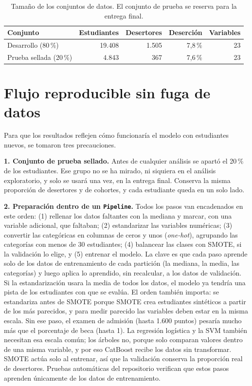 \documentclass[11pt,a4paper]{article}
\begin{document}
\begin{table}[H]
\centering
\small
\caption{Tamaño de los conjuntos de datos. El conjunto de prueba se reserva para la entrega final.}
\label{tab:escenarios}
\begin{tabular}{lrrrr}
\toprule
Conjunto & Estudiantes & Desertores & Deserción & Variables \\
\midrule
Desarrollo (80\,\%) & 19.408 & 1.505 & 7,8\,\% & 23 \\
Prueba sellada (20\,\%) & 4.843 & 367 & 7,6\,\% & 23 \\
\bottomrule
\end{tabular}
\end{table}

\section{Flujo reproducible sin fuga de datos}

Para que los resultados reflejen cómo funcionaría el modelo con estudiantes nuevos, se tomaron tres precauciones.

\textbf{1. Conjunto de prueba sellado.} Antes de cualquier análisis se apartó el 20\,\% de los estudiantes. Ese grupo no se ha mirado, ni siquiera en el análisis exploratorio, y solo se usará una vez, en la entrega final. Conserva la misma proporción de desertores y de cohortes, y cada estudiante queda en un solo lado.

\textbf{2. Preparación dentro de un \texttt{Pipeline}.} Todos los pasos van encadenados en este orden: (1) rellenar los datos faltantes con la mediana y marcar, con una variable adicional, que faltaban; (2) estandarizar las variables numéricas; (3) convertir las categóricas en columnas de ceros y unos (\textit{one-hot}), agrupando las categorías con menos de 30 estudiantes; (4) balancear las clases con SMOTE, si la validación lo elige, y (5) entrenar el modelo. La clave es que cada paso aprende solo de los datos de entrenamiento de cada partición (la mediana, la media, las categorías) y luego aplica lo aprendido, sin recalcular, a los datos de validación. Si la estandarización usara la media de todos los datos, el modelo ya tendría una pista de los estudiantes con que se evalúa. El orden también importa: se estandariza antes de SMOTE porque SMOTE crea estudiantes sintéticos a partir de los más parecidos, y para medir parecido las variables deben estar en la misma escala. Sin ese paso, el examen de admisión (hasta 1.600 puntos) pesaría mucho más que el porcentaje de beca (hasta 1). La regresión logística y la SVM también necesitan esa escala común; los árboles no, porque solo comparan valores dentro de una misma variable, y por eso CatBoost recibe los datos sin transformar. SMOTE actúa solo al entrenar, así que la validación conserva la proporción real de desertores. Pruebas automáticas del repositorio verifican que estos pasos aprenden únicamente de los datos de entrenamiento.
\end{document}
